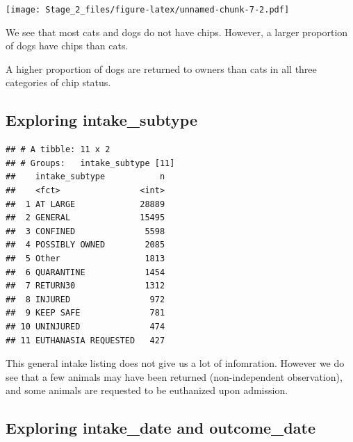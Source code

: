 \documentclass[]{article}
\newenvironment{Shaded}{\begin{snugshade}}{\end{snugshade}}
\newcommand{\KeywordTok}[1]{\textcolor[rgb]{0.13,0.29,0.53}{\textbf{#1}}}
\newcommand{\DataTypeTok}[1]{\textcolor[rgb]{0.13,0.29,0.53}{#1}}
\newcommand{\DecValTok}[1]{\textcolor[rgb]{0.00,0.00,0.81}{#1}}
\newcommand{\StringTok}[1]{\textcolor[rgb]{0.31,0.60,0.02}{#1}}
\newcommand{\OtherTok}[1]{\textcolor[rgb]{0.56,0.35,0.01}{#1}}
\newcommand{\OperatorTok}[1]{\textcolor[rgb]{0.81,0.36,0.00}{\textbf{#1}}}
\newcommand{\NormalTok}[1]{#1}
\begin{document}
\texttt{[image: Stage\_2\_files/figure-latex/unnamed-chunk-7-2.pdf]}

We see that most cats and dogs do not have chips. However, a larger
proportion of dogs have chips than cats.

A higher proportion of dogs are returned to owners than cats in all
three categories of chip status.

\subsection{Exploring intake\_subtype}\label{exploring-intake_subtype}

\begin{Shaded}
\end{Shaded}

\begin{verbatim}
## # A tibble: 11 x 2
## # Groups:   intake_subtype [11]
##    intake_subtype           n
##    <fct>                <int>
##  1 AT LARGE             28889
##  2 GENERAL              15495
##  3 CONFINED              5598
##  4 POSSIBLY OWNED        2085
##  5 Other                 1813
##  6 QUARANTINE            1454
##  7 RETURN30              1312
##  8 INJURED                972
##  9 KEEP SAFE              781
## 10 UNINJURED              474
## 11 EUTHANASIA REQUESTED   427
\end{verbatim}

This general intake listing does not give us a lot of infomration.
However we do see that a few animals may have been returned
(non-independent observation), and some animals are requested to be
euthanized upon admission.

\subsection{Exploring intake\_date and
outcome\_date}\label{exploring-intake_date-and-outcome_date}
\end{document}
